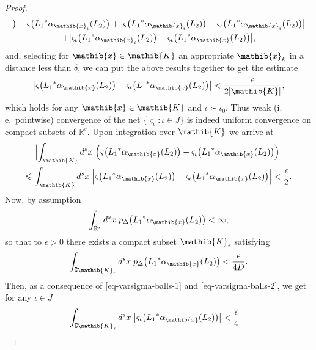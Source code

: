 \documentclass[11pt,twoside,openright]{report}
\theoremstyle{definition}
\theoremstyle{plain}
\theoremstyle{remark}
\theoremstyle{assumption}
\newcommand{\bset}[1]{\bigl\{ #1 \bigr\}}
\newcommand{\abs}[1]{\lvert #1 \rvert}
\newcommand{\babs}[1]{\bigl\lvert #1 \bigr\rvert}
\newcommand{\Babs}[1]{\Bigl\lvert #1 \Bigr\rvert}
\newcommand{\bpDx}[1]{p_\Delta \bigl( #1 \bigr)}
\newcommand{\Kib}{\mathib{K}}
\newcommand{\xib}{\mathib{x}}
\newcommand{\Rs}{\mathbb{R}^s}
\newcommand{\aibx}{\alpha_\mathib{x}}
\begin{document}
\begin{proof}
\begin{multline*}
{{    \bigr) - \varsigma \bigl( {L_1}^* \alpha_{\xib_i} ( L_2 ) \bigr)}
    + \babs{\varsigma \bigl( {L_1}^* \alpha_{\xib_i} ( L_2 ) \bigr) -
    \varsigma_\iota \bigl( {L_1}^* \alpha_{\xib_i} ( L_2 ) \bigr)}} \\
    + \babs{\varsigma_\iota \bigl( {L_1}^* \alpha_{\xib_i} ( L_2 )
    \bigr) - \varsigma_\iota \bigl( {L_1}^* \aibx ( L_2 ) \bigr)}
    \text{,}
  \end{multline*} 
  and, selecting for $\xib \in \Kib$ an appropriate $\xib_k$ in a
  distance less than $\delta$, we can put the above results together
  to get the estimate
  \begin{equation*}
    \babs{\varsigma \bigl( {L_1}^* \aibx ( L_2 ) \bigr) -
    \varsigma_\iota \bigl( {L_1}^* \aibx ( L_2 ) \bigr)} <
    \frac{\epsilon}{2 \abs{\Kib}} \text{,}
  \end{equation*}
  which holds for any $\xib \in \Kib$ and $\iota \succ \iota_0$. Thus
  weak (i.\,e.~pointwise) convergence of the net
  $\bset{\varsigma_\iota : \iota \in J}$ is indeed uniform convergence on
  compact subsets of $\Rs$. Upon integration over $\Kib$ we arrive at
  \begin{multline}
    \label{eq-varsigma-K-integral}
    \Babs{\int_\Kib d^s x \; \Bigl( \varsigma \bigl( {L_1}^* \aibx (
    L_2 ) \bigr) - \varsigma_\iota \bigl( {L_1}^* \aibx ( L_2 ) \bigr)
    \Bigr)} \\
    \leqslant \int_\Kib d^s x \; \Babs{\varsigma \bigl( {L_1}^* \aibx
    ( L_2 ) \bigr) - \varsigma_\iota \bigl( {L_1}^* \aibx ( L_2 )
    \bigr)} < \frac{\epsilon}{2} \text{.}
  \end{multline}
  Now, by assumption
  \begin{equation*}
    \int_{\Rs} d^s x \; \bpDx{{L_1}^* \aibx ( L_2 )} < \infty \text{,}
  \end{equation*}
  so that to $\epsilon > 0$ there exists a compact subset
  $\Kib_\epsilon$ satisfying
  \begin{equation*}
    \int_{\complement \Kib_\epsilon} d^s x \; \bpDx{{L_1}^* \aibx (
    L_2 )} < \frac{\epsilon}{4D} \text{.}
  \end{equation*}
  Then, as a consequence of \eqref{eq-varsigma-balls-1} and
  \eqref{eq-varsigma-balls-2}, we get for any $\iota \in J$
  \begin{subequations}
    \label{eq-varsigma-integrals}
    \begin{align}
      \label{eq-varsigma-int-1}
      \int_{\complement \Kib_\epsilon} d^s x \; \babs{\varsigma_\iota
      \bigl( {L_1}^* \aibx ( L_2 ) \bigr)} & < \frac{\epsilon}{4}

\end{align}
\end{subequations}
\end{proof}
\end{document}
